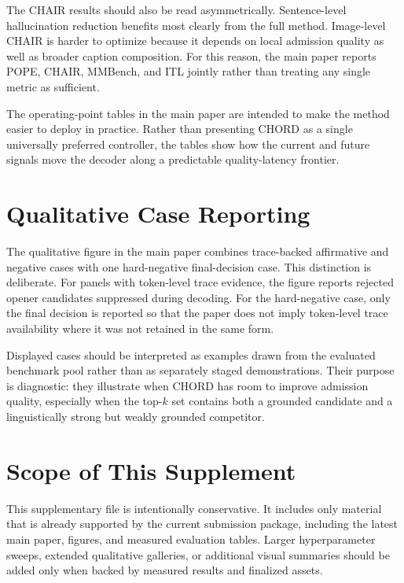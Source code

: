 \documentclass[sigconf,anonymous,nonacm]{acmart}
\begin{document}
The CHAIR results should also be read asymmetrically. Sentence-level hallucination reduction benefits most clearly from the full method. Image-level CHAIR is harder to optimize because it depends on local admission quality as well as broader caption composition. For this reason, the main paper reports POPE, CHAIR, MMBench, and ITL jointly rather than treating any single metric as sufficient.

The operating-point tables in the main paper are intended to make the method easier to deploy in practice. Rather than presenting CHORD as a single universally preferred controller, the tables show how the current and future signals move the decoder along a predictable quality-latency frontier.

\section{Qualitative Case Reporting}
\label{sec:supp_qualitative}

The qualitative figure in the main paper combines trace-backed affirmative and negative cases with one hard-negative final-decision case. This distinction is deliberate. For panels with token-level trace evidence, the figure reports rejected opener candidates suppressed during decoding. For the hard-negative case, only the final decision is reported so that the paper does not imply token-level trace availability where it was not retained in the same form.

Displayed cases should be interpreted as examples drawn from the evaluated benchmark pool rather than as separately staged demonstrations. Their purpose is diagnostic: they illustrate when CHORD has room to improve admission quality, especially when the top-$k$ set contains both a grounded candidate and a linguistically strong but weakly grounded competitor.

\section{Scope of This Supplement}
\label{sec:supp_scope}

This supplementary file is intentionally conservative. It includes only material that is already supported by the current submission package, including the latest main paper, figures, and measured evaluation tables. Larger hyperparameter sweeps, extended qualitative galleries, or additional visual summaries should be added only when backed by measured results and finalized assets.

\makeatletter
\let\balance\relax
\makeatother
\nobalance
\end{document}
